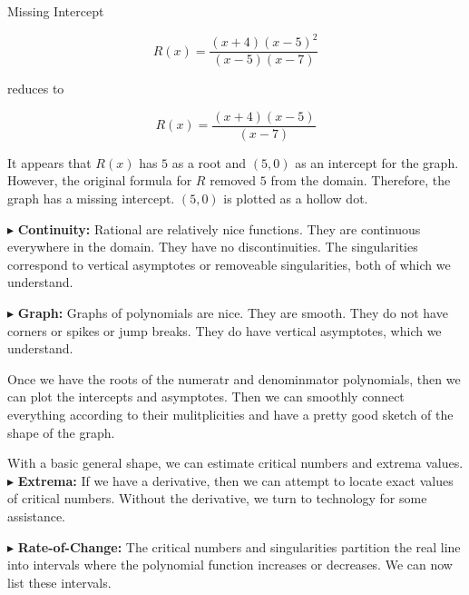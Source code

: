 \documentclass{ximera}
\begin{document}
\begin{example}  Missing Intercept

\[     R(x) = \frac{(x+4)(x-5)^2}{(x-5)(x-7)}     \]

reduces to 

\[     R(x) = \frac{(x+4)(x-5)}{(x-7)}     \]


It appears that $R(x)$ has $5$ as a root and $(5,0)$ as an intercept for the graph.  However, the original formula for $R$ removed $5$ from the domain.  Therefore, the graph has a missing intercept. $(5,0)$ is plotted as a hollow dot.






\end{example}







$\blacktriangleright$ \textbf{Continuity:}  Rational are relatively nice functions.  They are continuous everywhere in the domain.  They have no discontinuities.  The singularities correspond to vertical asymptotes or removeable singularities, both of which we understand.



$\blacktriangleright$ \textbf{Graph:} Graphs of polynomials are nice.  They are smooth.  They do not have corners or spikes or jump breaks. They do have vertical asymptotes, which we understand.


Once we have the roots of the numeratr and denominmator polynomials, then we can plot the intercepts and asymptotes.  Then we can smoothly connect everything according to their mulitplicities and have a pretty good sketch of the shape of the graph.

With a basic general shape, we can estimate critical numbers and extrema values. \\




$\blacktriangleright$ \textbf{Extrema:} If we have a derivative, then we can attempt to locate exact values of critical numbers.  Without the derivative, we turn to technology for some assistance.




$\blacktriangleright$ \textbf{Rate-of-Change:} The critical numbers and singularities partition the real line into intervals where the polynomial function increases or decreases.  We can now list these intervals.
\end{document}
